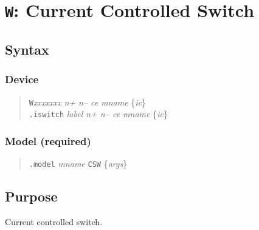 %
%
%
%
\section{{\tt W}: Current Controlled Switch}
\subsection{Syntax}
\subsubsection{Device}
\begin{verse}
{\tt W}{\it xxxxxxx n+ n-- ce mname} \{{\it ic}\}\\
{\tt .iswitch} {\it label n+ n-- ce mname} \{{\it ic}\}
\end{verse}
\subsubsection{Model (required)}
\begin{verse}
{\tt .model} {\it mname} {\tt CSW} \{{\it args}\}
\end{verse}
\subsection{Purpose}

Current controlled switch.
